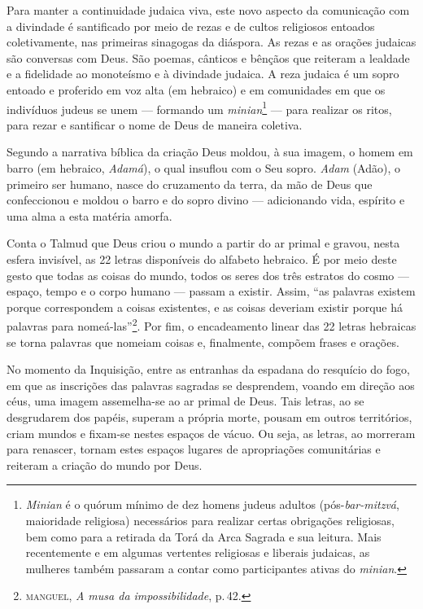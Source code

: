 Para manter a continuidade judaica viva, este novo aspecto da
comunicação com a divindade é santificado por meio de rezas e de cultos
religiosos entoados coletivamente, nas primeiras sinagogas da diáspora.
As rezas e as orações judaicas são conversas com Deus. São poemas,
cânticos e bênçãos que reiteram a lealdade e a fidelidade ao monoteísmo
e à divindade judaica. A reza judaica é um sopro entoado e proferido em
voz alta (em hebraico) e em comunidades em que os indivíduos judeus se
unem --- formando um \emph{minian}\footnote{\emph{Minian} é o quórum
  mínimo de dez homens judeus adultos (pós-\emph{bar-mitzvá}, maioridade
  religiosa) necessários para realizar certas obrigações religiosas, bem
  como para a retirada da Torá da Arca Sagrada e sua leitura.
  Mais recentemente e em algumas vertentes religiosas e liberais
  judaicas, as mulheres também passaram a contar como participantes
  ativas do \emph{minian}.} --- para realizar os ritos, para rezar e
santificar o nome de Deus de maneira coletiva.

Segundo a narrativa bíblica da criação Deus moldou, à sua imagem, o
homem em barro (em hebraico, \emph{Adamá}), o qual insuflou com o Seu
sopro. \emph{Adam} (Adão), o primeiro ser humano, nasce do cruzamento da
terra, da mão de Deus que confeccionou e moldou o barro e do sopro
divino --- adicionando vida, espírito e uma alma a esta matéria amorfa.

Conta o Talmud que Deus criou o mundo a partir do ar primal e
gravou, nesta esfera invisível, as 22 letras disponíveis do alfabeto
hebraico. É por meio deste gesto que todas as coisas do mundo, todos os
seres dos três estratos do cosmo --- espaço, tempo e o corpo humano ---
passam a existir. Assim, ``as palavras existem porque correspondem
a coisas existentes, e as coisas deveriam existir porque há palavras
para nomeá-las''\footnote{\textsc{manguel}, \emph{A musa da impossibilidade}, p.\,42.}. Por fim, o encadeamento linear das 22 letras hebraicas se torna
palavras que nomeiam coisas e, finalmente, compõem frases e orações.

No momento da Inquisição, entre as entranhas da espadana do resquício do
fogo, em que as inscrições das palavras sagradas se desprendem, voando
em direção aos céus, uma imagem assemelha-se ao ar primal de Deus. Tais
letras, ao se desgrudarem dos papéis, superam a própria morte, pousam em
outros territórios, criam mundos e fixam-se nestes espaços de vácuo. Ou
seja, as letras, ao morreram para renascer, tornam estes espaços lugares
de apropriações comunitárias e reiteram a criação do mundo por Deus.

